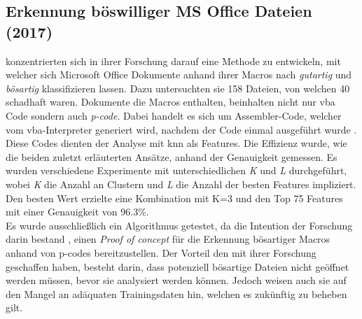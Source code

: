 \documentclass[
    12pt, %
    DIV10,
    ngerman, %
    a4paper, %
    oneside, %
    titlepage, %
    parskip=half, %
    headings=normal, %
    listof=totoc, %
    bibliography=totoc, %
    index=totoc, %
    captions=tableheading, %
    final %
]{scrreprt}
\begin{document}
%
\subsection{Erkennung böswilliger MS Office Dateien (2017)}
\textcite{Bearden2018} konzentrierten sich in ihrer Forschung darauf eine Methode zu entwickeln, mit welcher sich Microsoft Office Dokumente anhand ihrer Macros nach \emph{gutartig} und \emph{bösartig} klassifizieren lassen. Dazu untersuchten sie 158 Dateien, von welchen 40 schadhaft waren. Dokumente die Macros enthalten, beinhalten nicht nur \ac{vba} Code sondern auch \emph{p-code}. Dabei handelt es sich um Assembler-Code, welcher vom \ac{vba}-Interpreter generiert wird, nachdem der Code einmal ausgeführt wurde \parencite{Bearden2018}. Diese Codes dienten der Analyse mit \ac{knn} als Features. Die Effizienz wurde, wie die beiden zuletzt erläuterten Ansätze, anhand der Genauigkeit gemessen. Es wurden verschiedene Experimente mit unterschiedlichen \emph{K} und \emph{L} durchgeführt, wobei \emph{K} die Anzahl an Clustern und \emph{L} die Anzahl der besten Features impliziert. Den besten Wert erzielte eine Kombination mit K=3 und den Top 75 Features mit einer Genauigkeit von 96.3\%.\\Es wurde ausschließlich ein Algorithmus getestet, da die Intention der Forschung darin bestand , einen \emph{Proof of concept} für die Erkennung bösartiger Macros anhand von p-codes bereitzustellen. Der Vorteil den \textcite{Bearden2018} mit ihrer Forschung geschaffen haben, besteht darin, dass potenziell bösartige Dateien nicht geöffnet werden müssen, bevor sie analysiert werden können. Jedoch weisen auch sie auf den Mangel an adäquaten Trainingsdaten hin, welchen es zukünftig zu beheben gilt.
%
\end{document}

